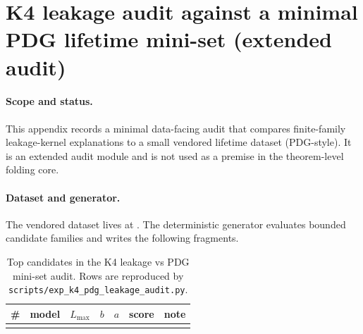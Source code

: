 \section{K4 leakage audit against a minimal PDG lifetime mini-set (extended audit)}
\label{app:k4_pdg_leakage_audit}

\paragraph{Scope and status.}
\AuditTag This appendix records a minimal data-facing audit that compares finite-family leakage-kernel explanations to a small vendored lifetime dataset (PDG-style).
It is an extended audit module and is not used as a premise in the theorem-level folding core.

\paragraph{Dataset and generator.}
\AuditTag The vendored dataset lives at .
The deterministic generator  evaluates bounded candidate families and writes the following fragments.

\begin{table}[t]
\centering
\scriptsize
\setlength{\tabcolsep}{6pt}
\renewcommand{\arraystretch}{1.15}
\begin{tabular}{r l r r r r l}
\toprule
\# & model & $L_{\max}$ & $b$ & $a$ & score & note \\
\midrule
%
\\
\bottomrule
\end{tabular}
\caption{Top candidates in the K4 leakage vs PDG mini-set audit. Rows are reproduced by \texttt{scripts/exp\_k4\_pdg\_leakage\_audit.py}.}
\label{tab:k4_pdg_leakage_audit}
\end{table}

%

